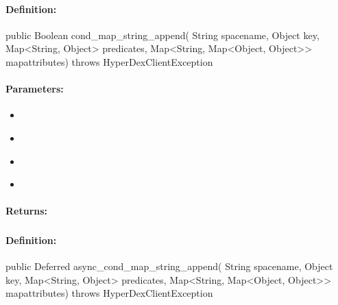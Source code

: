 \paragraph{Definition:}
\begin{javacode}
public Boolean cond_map_string_append(
        String spacename,
        Object key,
        Map<String, Object> predicates,
        Map<String, Map<Object, Object>> mapattributes) throws HyperDexClientException
\end{javacode}

\paragraph{Parameters:}
\begin{itemize}[noitemsep]
\item {}\\

\item {}\\

\item {}\\

\item {}\\

\end{itemize}

\paragraph{Returns:}


\pagebreak
\subsubsection{}
\label{api:java:async_cond_map_string_append}


\paragraph{Definition:}
\begin{javacode}
public Deferred async_cond_map_string_append(
        String spacename,
        Object key,
        Map<String, Object> predicates,
        Map<String, Map<Object, Object>> mapattributes) throws HyperDexClientException
\end{javacode}

